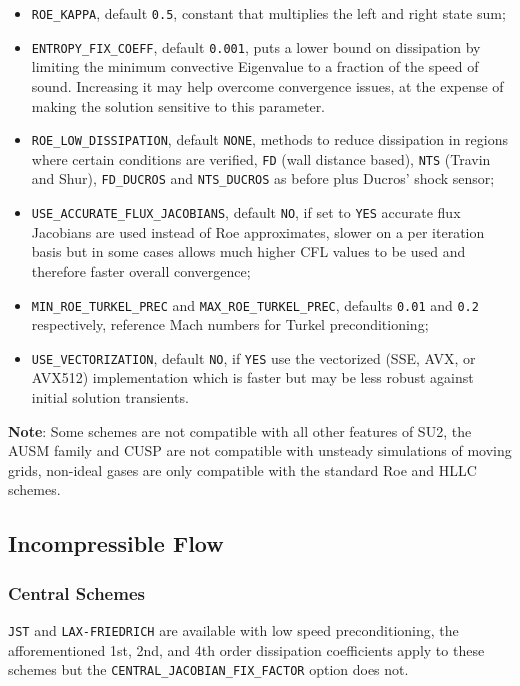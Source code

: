 \documentclass{article}
\begin{document}
\begin{itemize}
    \item \verb|ROE_KAPPA|, default \verb|0.5|, constant that multiplies the left and right state sum;
    \item \verb|ENTROPY_FIX_COEFF|, default \verb|0.001|, puts a lower bound on dissipation by limiting the minimum convective Eigenvalue to a fraction of the speed of sound. Increasing it may help overcome convergence issues, at the expense of making the solution sensitive to this parameter.
    \item \verb|ROE_LOW_DISSIPATION|, default \verb|NONE|, methods to reduce dissipation in regions where certain conditions are verified, \verb|FD| (wall distance based), \verb|NTS| (Travin and Shur), \verb|FD_DUCROS| and \verb|NTS_DUCROS| as before plus Ducros’ shock sensor;
    \item \verb|USE_ACCURATE_FLUX_JACOBIANS|, default \verb|NO|, if set to \verb|YES| accurate flux Jacobians are used instead of Roe approximates, slower on a per iteration basis but in some cases allows much higher CFL values to be used and therefore faster overall convergence;
    \item \verb|MIN_ROE_TURKEL_PREC| and \verb|MAX_ROE_TURKEL_PREC|, defaults \verb|0.01| and \verb|0.2| respectively, reference Mach numbers for Turkel preconditioning;
    \item \verb|USE_VECTORIZATION|, default \verb|NO|, if \verb|YES| use the vectorized (SSE, AVX, or AVX512) implementation which is faster but may be less robust against initial solution transients.
    
\end{itemize}
   
\textbf{Note}: Some schemes are not compatible with all other features of SU2, the AUSM family and CUSP are not compatible with unsteady simulations of moving grids, non-ideal gases are only compatible with the standard Roe and HLLC schemes.


\subsection{Incompressible Flow}
\subsubsection{Central Schemes}

\verb|JST| and \verb|LAX-FRIEDRICH| are available with low speed preconditioning, the afforementioned 1st, 2nd, and 4th order dissipation coefficients apply to these schemes but the \verb|CENTRAL_JACOBIAN_FIX_FACTOR| option does not.
\end{document}
